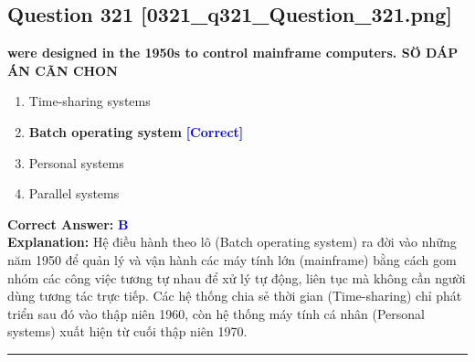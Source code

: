 \documentclass[11pt,a4paper]{article}
\begin{document}
\begin{minipage}{\textwidth}
\subsection*{Question 321 \quad \footnotesize{[0321\_q321\_Question\_321.png]}}
\noindent \textbf{were designed in the 1950s to control mainframe computers. SÖ DÁP ÁN CÃN CHON}

\begin{enumerate}[label=\Alph*.]
    \item Time-sharing systems
    \item \textbf{Batch operating system} \hfill \textcolor{blue}{\textbf{[Correct]}}
    \item Personal systems
    \item Parallel systems
\end{enumerate}

\noindent \textbf{Correct Answer:} \textcolor{blue}{\textbf{B}} \\[2pt]
\noindent \textbf{Explanation:} Hệ điều hành theo lô (Batch operating system) ra đời vào những năm 1950 để quản lý và vận hành các máy tính lớn (mainframe) bằng cách gom nhóm các công việc tương tự nhau để xử lý tự động, liên tục mà không cần người dùng tương tác trực tiếp. Các hệ thống chia sẻ thời gian (Time-sharing) chỉ phát triển sau đó vào thập niên 1960, còn hệ thống máy tính cá nhân (Personal systems) xuất hiện từ cuối thập niên 1970.

\par\vspace{0.3cm}
\hrule
\vspace{0.3cm}
\end{minipage}
\end{document}
